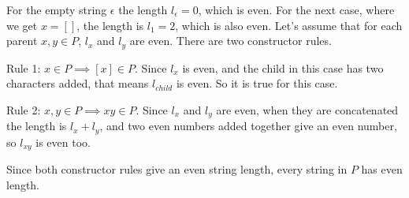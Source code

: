 \documentclass{article}
\begin{document}
For the empty string $\epsilon$ the length $l_{\epsilon} = 0$, which is even. For the next case, where we get $x = []$, the length is $l_1 = 2$, which is also even. Let's assume that for each parent $x,y \in P$, $l_x$ and $l_y$ are even. There are two constructor rules.

Rule 1: $x \in P \implies [x] \in P$. Since $l_x$ is even, and the child in this case has two characters added, that means $l_{child}$ is even. So it is true for this case.

Rule 2: $x,y \in P \implies xy \in P$. Since $l_x$ and $l_y$ are even, when they are concatenated the length is $l_x + l_y$, and two even numbers added together give an even number, so $l_{xy}$ is even too.

Since both constructor rules give an even string length, every string in $P$ has even length.
\end{document}
